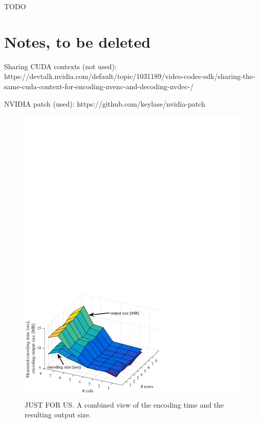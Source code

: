 TODO

\section{Notes, to be deleted}
Sharing CUDA contexts (not used): https://devtalk.nvidia.com/default/topic/1031189/video-codec-sdk/sharing-the-same-cuda-context-for-encoding-nvenc-and-decoding-nvdec-/

NVIDIA patch (used): https://github.com/keylase/nvidia-patch

\begin{figure}[t]
	\includegraphics[width=\columnwidth]{figures/times_size_combined_v1.pdf}
	\caption{JUST FOR US. A combined view of the encoding time and the resulting output size.}
\end{figure}
